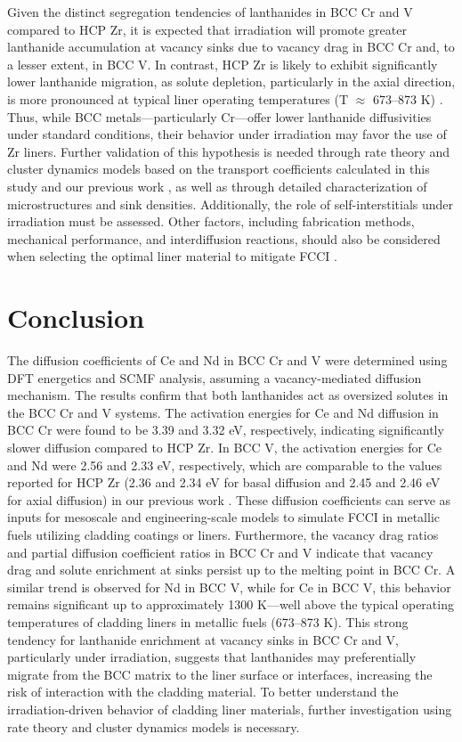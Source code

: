 \documentclass[preprint,12pt]{elsarticle}
\begin{document}
Given the distinct segregation tendencies of lanthanides in BCC Cr and V compared to HCP Zr, it is expected that irradiation will promote greater lanthanide accumulation at vacancy sinks due to vacancy drag in BCC Cr and, to a lesser extent, in BCC V. In contrast, HCP Zr is likely to exhibit significantly lower lanthanide migration, as solute depletion, particularly in the axial direction, is more pronounced at typical liner operating temperatures (T $\approx$ 673–873 K) \citep{beausoleil_fast_2022}. Thus, while BCC metals—particularly Cr—offer lower lanthanide diffusivities under standard conditions, their behavior under irradiation may favor the use of Zr liners. Further validation of this hypothesis is needed through rate theory and cluster dynamics models based on the transport coefficients calculated in this study and our previous work \citep{shousha2024first}, as well as through detailed characterization of microstructures and sink densities. Additionally, the role of self-interstitials under irradiation must be assessed. Other factors, including fabrication methods, mechanical performance, and interdiffusion reactions, should also be considered when selecting the optimal liner material to mitigate FCCI \cite{OH2024113102}.

\FloatBarrier
\section{Conclusion}
The diffusion coefficients of Ce and Nd in BCC Cr and V were determined using DFT energetics and SCMF analysis, assuming a vacancy-mediated diffusion mechanism. The results confirm that both lanthanides act as oversized solutes in the BCC Cr and V systems. The activation energies for Ce and Nd diffusion in BCC Cr were found to be 3.39 and 3.32 eV, respectively, indicating significantly slower diffusion compared to HCP Zr. In BCC V, the activation energies for Ce and Nd were 2.56 and 2.33 eV, respectively, which are comparable to the values reported for HCP Zr (2.36 and 2.34 eV for basal diffusion and 2.45 and 2.46 eV for axial diffusion) in our previous work \citep{shousha2024first}. These diffusion coefficients can serve as inputs for mesoscale and engineering-scale models to simulate FCCI in metallic fuels utilizing cladding coatings or liners. Furthermore, the vacancy drag ratios and partial diffusion coefficient ratios in BCC Cr and V indicate that vacancy drag and solute enrichment at sinks persist up to the melting point in BCC Cr. A similar trend is observed for Nd in BCC V, while for Ce in BCC V, this behavior remains significant up to approximately 1300 K—well above the typical operating temperatures of cladding liners in metallic fuels (673–873 K). This strong tendency for lanthanide enrichment at vacancy sinks in BCC Cr and V, particularly under irradiation, suggests that lanthanides may preferentially migrate from the BCC matrix to the liner surface or interfaces, increasing the risk of interaction with the cladding material. To better understand the irradiation-driven behavior of cladding liner materials, further investigation using rate theory and cluster dynamics models is necessary.
\end{document}
